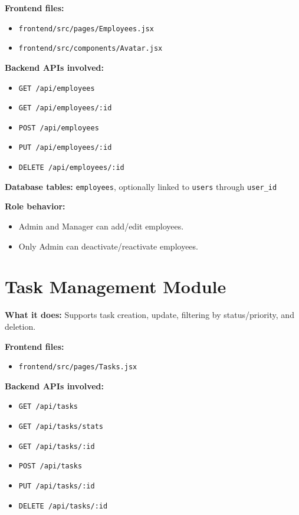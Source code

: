 \textbf{Frontend files:}
\begin{itemize}[leftmargin=1.3cm]
\item \texttt{frontend/src/pages/Employees.jsx}
\item \texttt{frontend/src/components/Avatar.jsx}
\end{itemize}

\textbf{Backend APIs involved:}
\begin{itemize}[leftmargin=1.3cm]
\item \texttt{GET /api/employees}
\item \texttt{GET /api/employees/:id}
\item \texttt{POST /api/employees}
\item \texttt{PUT /api/employees/:id}
\item \texttt{DELETE /api/employees/:id}
\end{itemize}

\textbf{Database tables:} \texttt{employees}, optionally linked to \texttt{users} through \texttt{user\_id}

\textbf{Role behavior:}
\begin{itemize}[leftmargin=1.3cm]
\item Admin and Manager can add/edit employees.
\item Only Admin can deactivate/reactivate employees.
\end{itemize}

\section{Task Management Module}
\textbf{What it does:} Supports task creation, update, filtering by status/priority, and deletion.

\textbf{Frontend files:}
\begin{itemize}[leftmargin=1.3cm]
\item \texttt{frontend/src/pages/Tasks.jsx}
\end{itemize}

\textbf{Backend APIs involved:}
\begin{itemize}[leftmargin=1.3cm]
\item \texttt{GET /api/tasks}
\item \texttt{GET /api/tasks/stats}
\item \texttt{GET /api/tasks/:id}
\item \texttt{POST /api/tasks}
\item \texttt{PUT /api/tasks/:id}
\item \texttt{DELETE /api/tasks/:id}
\end{itemize}


